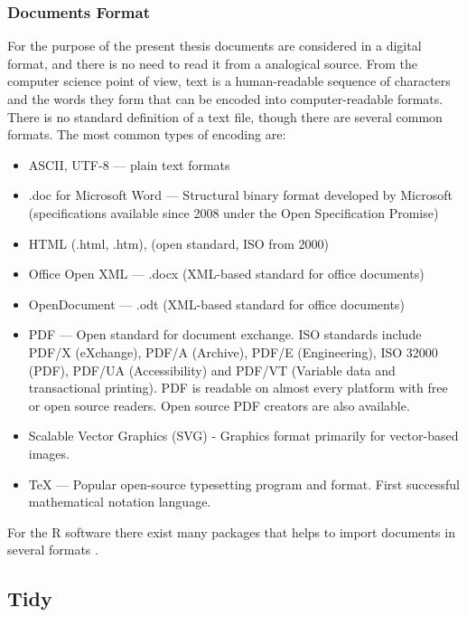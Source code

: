 \documentclass[]{book}
\providecommand{\tightlist}{%
  \setlength{\itemsep}{0pt}\setlength{\parskip}{0pt}}
\begin{document}
\subsubsection{Documents Format}\label{sotatoolsimportformat}

For the purpose of the present thesis documents are considered in a
digital format, and there is no need to read it from a analogical
source. From the computer science point of view, text is a
human-readable sequence of characters and the words they form that can
be encoded into computer-readable formats. There is no standard
definition of a text file, though there are several common formats. The
most common types of encoding are:

\begin{itemize}
\tightlist
\item
  ASCII, UTF-8 --- plain text formats
\item
  .doc for Microsoft Word --- Structural binary format developed by
  Microsoft (specifications available since 2008 under the Open
  Specification Promise)
\item
  HTML (.html, .htm), (open standard, ISO from 2000)
\item
  Office Open XML --- .docx (XML-based standard for office documents)
\item
  OpenDocument --- .odt (XML-based standard for office documents)
\item
  PDF --- Open standard for document exchange. ISO standards include
  PDF/X (eXchange), PDF/A (Archive), PDF/E (Engineering), ISO 32000
  (PDF), PDF/UA (Accessibility) and PDF/VT (Variable data and
  transactional printing). PDF is readable on almost every platform with
  free or open source readers. Open source PDF creators are also
  available.
\item
  Scalable Vector Graphics (SVG) - Graphics format primarily for
  vector-based images.
\item
  TeX --- Popular open-source typesetting program and format. First
  successful mathematical notation language.
\end{itemize}

For the R software there exist many packages that helps to import
documents in several formats \citep{readr2017r}.

\subsection{Tidy}\label{sotatoolstidy}
\end{document}
